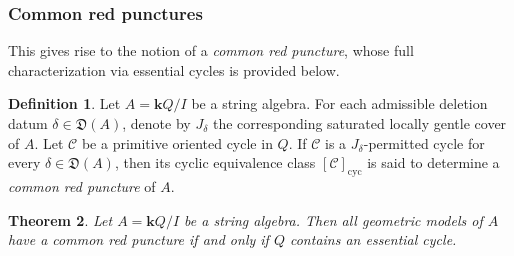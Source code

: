 \documentclass[11pt]{amsart}
\numberwithin{equation}{section}
\newtheorem{theorem}{Theorem}[section]
\theoremstyle{definition}
\newtheorem{definition}[theorem]{Definition}
\begin{document}
\subsubsection{Common red punctures}
This gives rise to the notion of a \emph {common red puncture}, whose full characterization via essential cycles is provided below.
\begin{definition}\label{def:common-red-puncture}
Let \(A=\mathbf{k}Q/I\) be a string algebra. For each admissible deletion datum
\(\delta\in\mathfrak D(A)\), denote by \(J_\delta\) the corresponding
saturated locally gentle cover of $A$. Let \(\mathcal C\) be a primitive
oriented cycle in \(Q\). If \(\mathcal C\) is a
\(J_\delta\)-permitted cycle for every
\(\delta\in\mathfrak D(A)\), then its cyclic equivalence class $[\mathcal C]_{\mathrm{cyc}}$ is said to determine a \emph{common red puncture} of \(A\).
\end{definition}

\begin{theorem}\label{thm:common-red-essential}
Let \(A=\mathbf{k}Q/I\) be a string algebra. Then all geometric models of \(A\) have a common red puncture
if and only if \(Q\) contains an essential cycle.
\end{theorem}
\end{document}
